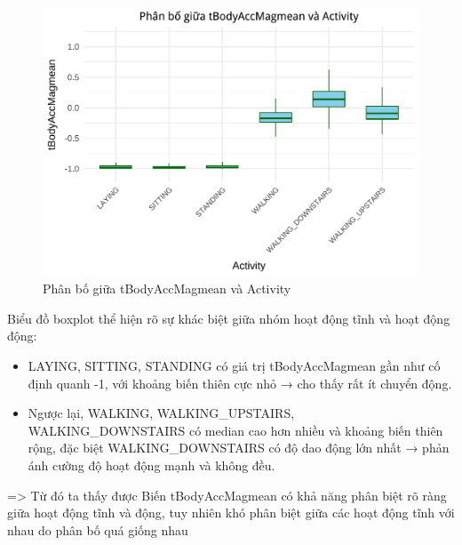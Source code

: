 \documentclass[
]{article}
\begin{document}
\begin{figure}
\centering
\includegraphics{report_files/figure-latex/unnamed-chunk-14-1.pdf}
\caption{Phân bố giữa tBodyAccMagmean và Activity}
\end{figure}

Biểu đồ boxplot thể hiện rõ sự khác biệt giữa nhóm hoạt động tĩnh và
hoạt động động:

\begin{itemize}
\item
  LAYING, SITTING, STANDING có giá trị tBodyAccMagmean gần như cố định
  quanh -1, với khoảng biến thiên cực nhỏ → cho thấy rất ít chuyển động.
\item
  Ngược lại, WALKING, WALKING\_UPSTAIRS, WALKING\_DOWNSTAIRS có median
  cao hơn nhiều và khoảng biến thiên rộng, đặc biệt WALKING\_DOWNSTAIRS
  có độ dao động lớn nhất → phản ánh cường độ hoạt động mạnh và không
  đều.
\end{itemize}

=\textgreater{} Từ đó ta thấy được Biến tBodyAccMagmean có khả năng phân
biệt rõ ràng giữa hoạt động tĩnh và động, tuy nhiên khó phân biệt giữa
các hoạt động tĩnh với nhau do phân bố quá giống nhau
\end{document}
